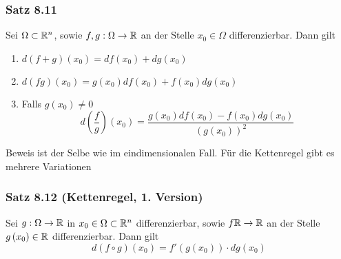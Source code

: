 \subsubsection*{Satz 8.11}
Sei $\Omega\subset\mathbb{R}^n$, sowie $f,g:\Omega\to\mathbb{R}$ an der Stelle $x_0\in\Omega$ differenzierbar. Dann gilt \begin{enumerate}
\item $d\left( {f + g} \right)\left( {{x_0}} \right) = df\left( {{x_0}} \right) + dg\left( {{x_0}} \right)$
\item $d\left( {fg} \right)\left( {{x_0}} \right) = g\left( {{x_0}} \right)df\left( {{x_0}} \right) + f\left( {{x_0}} \right)dg\left( {{x_0}} \right)$
\item Falls $g\left( x_0\right)\not=0$ \[d\left( {\frac{f}{g}} \right)\left( {{x_0}} \right) = \frac{{g\left( {{x_0}} \right)df\left( {{x_0}} \right) - f\left( {{x_0}} \right)dg\left( {{x_0}} \right)}}{{{{\left( {g\left( {{x_0}} \right)} \right)}^2}}}\]
\end{enumerate}
Beweis ist der Selbe wie im eindimensionalen Fall. Für die Kettenregel gibt es mehrere Variationen

\subsubsection*{Satz 8.12 (Kettenregel, 1. Version)}
Sei $g:\Omega\to\mathbb{R}$ in $x_0\in\Omega\subset\mathbb{R}^n$ differenzierbar, sowie $f\mathbb{R}\to\mathbb{R}$ an der Stelle $g\left( x_0\right)\in\mathbb{R}$ differenzierbar. Dann gilt \[d\left( {f \circ g} \right)\left( {{x_0}} \right) = f'\left( {g\left( {{x_0}} \right)} \right) \cdot dg\left( {{x_0}} \right)\]


